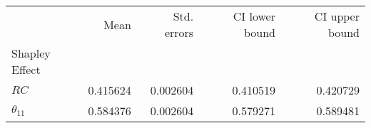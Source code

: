 \begin{tabular}{lrrrr}
\toprule
{} &      Mean &  Std. errors &  CI lower bound &  CI upper bound \\
Shapley Effect &           &              &                 &                 \\
\midrule
$RC$           &  0.415624 &     0.002604 &        0.410519 &        0.420729 \\
$\theta_{11}$  &  0.584376 &     0.002604 &        0.579271 &        0.589481 \\
\bottomrule
\end{tabular}
